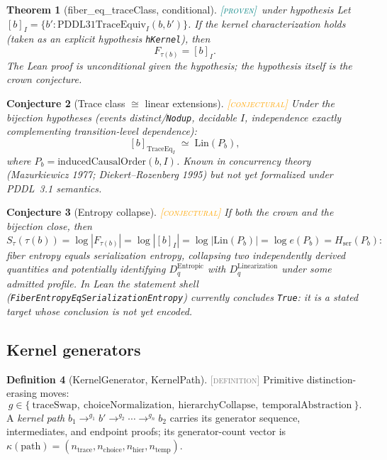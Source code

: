 \documentclass[11pt]{article}
\newcommand{\PROVEN}{\textcolor{teal}{\textsc{[proven]}}}
\newcommand{\DEFINITION}{\textcolor{gray}{\textsc{[definition]}}}
\newcommand{\CONJECTURAL}{\textcolor{orange}{\textsc{[conjectural]}}}
\newcommand{\tmap}{\tau}                       %
\newcommand{\fib}[1]{F_{#1}}                   %
\newcommand{\Lin}{\mathrm{Lin}}
\newcommand{\Hser}{H_{\mathrm{ser}}}
\theoremstyle{plain}
\newtheorem{theorem}{Theorem}[section]
\newtheorem{conjecture}[theorem]{Conjecture}
\theoremstyle{definition}
\newtheorem{definition}[theorem]{Definition}
\begin{document}
\begin{theorem}[fiber\_eq\_traceClass, conditional]\PROVEN\ \emph{under
hypothesis}\;
Let $[b]_I = \{b' : \mathrm{PDDL31TraceEquiv}_I(b, b')\}$. If the kernel
characterization holds (taken as an explicit hypothesis \texttt{hKernel}),
then
\[
  \fib{\tmap(b)} = [b]_I .
\]
The Lean proof is unconditional \emph{given} the hypothesis; the hypothesis
itself is the crown conjecture.
\end{theorem}

\begin{conjecture}[Trace class $\cong$ linear extensions]\CONJECTURAL\;
Under the bijection hypotheses (events distinct/\texttt{Nodup}, decidable
$I$, independence exactly complementing transition-level dependence):
\[
  [b]_{\mathrm{TraceEq}_I} \;\simeq\; \Lin(P_b),
\]
where $P_b = \mathrm{inducedCausalOrder}(b, I)$. Known in concurrency theory
(Mazurkiewicz 1977; Diekert--Rozenberg 1995) but not yet formalized under
PDDL~3.1 semantics.
\end{conjecture}

\begin{conjecture}[Entropy collapse]\CONJECTURAL\;
If both the crown and the bijection close, then
\[
  S_\tmap(\tmap(b))
  = \log|\fib{\tmap(b)}|
  = \log|[b]_I|
  = \log|\Lin(P_b)|
  = \log e(P_b)
  = \Hser(P_b):
\]
\emph{fiber entropy equals serialization entropy}, collapsing two
independently derived quantities and potentially identifying
$D_q^{\mathrm{Entropic}}$ with $D_q^{\mathrm{Linearization}}$ under some
admitted profile. In Lean the statement shell
(\texttt{FiberEntropyEqSerializationEntropy}) currently concludes
\texttt{True}: it is a stated target whose conclusion is not yet encoded.
\end{conjecture}

\subsection{Kernel generators}

\begin{definition}[KernelGenerator, KernelPath]\DEFINITION\;
Primitive distinction-erasing moves:
\[
  g \in \{\ \mathrm{traceSwap},\ \mathrm{choiceNormalization},\
  \mathrm{hierarchyCollapse},\ \mathrm{temporalAbstraction}\ \}.
\]
A \emph{kernel path} $b_1 \to^{g_1} b' \to^{g_2} \cdots \to^{g_n} b_2$
carries its generator sequence, intermediates, and endpoint proofs; its
generator-count vector is
$\kappa(\mathrm{path}) = (n_{\mathrm{trace}}, n_{\mathrm{choice}},
n_{\mathrm{hier}}, n_{\mathrm{temp}})$.
\end{definition}
\end{document}

